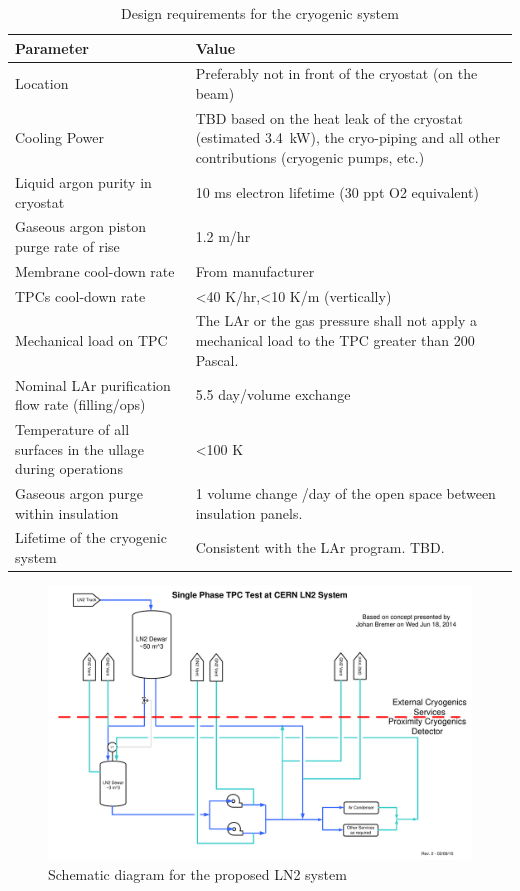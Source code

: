 \begin{table}[htbp]
\label{tbl:cryo-design-parameters}
\centering
\begin{tabular}{|p{}|p{}|}
\hline
 \textbf{ Parameter} & \textbf{Value} \\ \hline
 Location & Preferably not in front of the cryostat (on the beam) \\ \hline
 Cooling Power & TBD based on the heat leak of the cryostat (estimated 3.4~kW), the cryo-piping and all other contributions (cryogenic pumps, etc.) \\ \hline
 Liquid argon purity in cryostat & 10 ms electron lifetime (30 ppt O2 equivalent) \\  \hline
 Gaseous argon piston purge rate of rise & 1.2 m/hr \\ \hline
 Membrane cool-down rate & From manufacturer \\  \hline
 TPCs cool-down rate & \textless40 K/hr,\textless10 K/m (vertically)
 \\ \hline
Mechanical load on TPC & The LAr or the gas pressure shall not apply a mechanical load to the TPC greater than 200 Pascal. \\ \hline
Nominal LAr purification flow rate (filling/ops) & 5.5 day/volume exchange \\ \hline
 Temperature of all surfaces in the ullage during operations & \textless100 K \\  \hline
 Gaseous argon purge within insulation & 1 volume change /day of the open space between insulation panels. \\ \hline
 Lifetime of the cryogenic system & Consistent with the LAr program. TBD. \\ \hline
\end{tabular}
\caption{Design requirements for the cryogenic system}
\end{table}

\begin{figure}[htb]
\begin{center}
\includegraphics[width=.75\textwidth]{figures/proposed-LN2-system} 
\caption[Schematic diagram for the proposed LN2 system]{\label{fig:proposed-LN2-system}Schematic diagram for the proposed LN2 system}
\end{center}
\end{figure}

